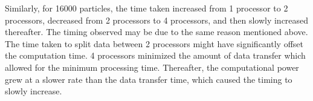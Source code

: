 \documentclass{article}
\begin{document}
Similarly, for 16000 particles, the time taken increased from 1 processor to 2 processors, decreased from 2 processors to 4 processors, and then slowly increased thereafter. The timing observed may be due to the same reason mentioned above. The time taken to split data between 2 processors might have significantly offset the computation time. 4 processors minimized the amount of data transfer which allowed for the minimum processing time. Thereafter, the computational power grew at a slower rate than the data transfer time, which caused the timing to slowly increase.
\end{document}
